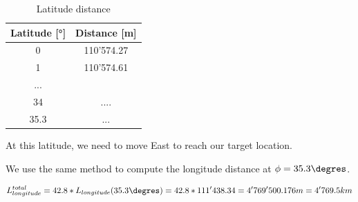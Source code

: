 \documentclass[12pt,a4paper]{article}
\begin{document}
\begin{table}[ht]
	\caption{Latitude distance} %
	\centering %
	\begin{tabular}{c c } %
		\hline\hline %
		Latitude [°] & Distance [m] \\ [0.5ex] %
		\hline %
		0 & 110'574.27 \\ %
		1 & 110'574.61 \\
		... &  \\ 
		34 & .... \\
		35.3 & ... \\ 
		[1ex] %
		\hline %
	\end{tabular}\label{table:nonlin} %
\end{table}

At this latitude, we need to move East to reach our target location. 

We use the same method to compute the longitude distance at $\phi=35.3\degres$. 

\begin{dmath}
	L_{longitude}^{total} = 42.8 * L_{longitude}(35.3\degres) = 42.8 * 111'438.34  = 4'769'500.176 m = 4'769.5 km
\end{dmath}

\newpage
\end{document}
